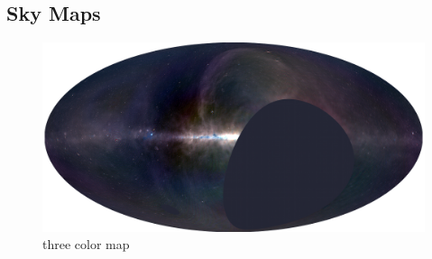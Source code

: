 \documentclass[twocolumn]{aastex6}
\begin{document}
\subsection{Sky Maps}

\begin{figure}[ht]
    \includegraphics[width=\textwidth]{maps/rgb-map-small}
    \caption{three color map}
\end{figure}
\end{document}
